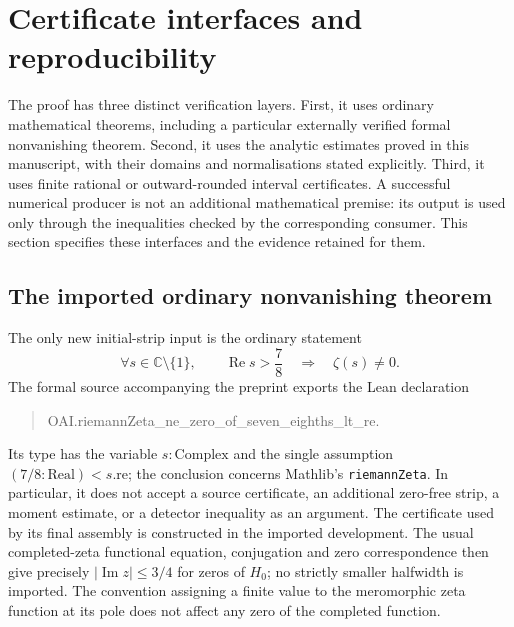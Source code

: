 \documentclass[11pt,a4paper]{article}
\theoremstyle{definition}
\theoremstyle{remark}
\newcommand{\Ree}{\operatorname{Re}}
\newcommand{\Imm}{\operatorname{Im}}
\begin{document}


\section{Certificate interfaces and reproducibility}\label{ver:section}

The proof has three distinct verification layers.  First, it uses ordinary
mathematical theorems, including a particular externally verified formal
nonvanishing theorem.  Second, it uses the analytic estimates proved in this
manuscript, with their domains and normalisations stated explicitly.  Third,
it uses finite rational or outward-rounded interval certificates.  A successful
numerical producer is not an additional mathematical premise: its output is
used only through the inequalities checked by the corresponding consumer.
This section specifies these interfaces and the evidence retained for them.

\subsection{The imported ordinary nonvanishing theorem}\label{ver:formal}

The only new initial-strip input is the ordinary statement
\begin{equation}\label{ver:zeta-input}
 \forall s\in\mathbb C\setminus\{1\},\qquad
 \Ree s>\frac78\quad\Longrightarrow\quad\zeta(s)\ne0.
\end{equation}
The formal source \cite{SevenEighths} accompanying the preprint
\cite{OAI:The-Quasi-Riemann-Hypothesis-September-30-2026} exports the Lean declaration
\begin{quote}\small\ttfamily
OAI.riemannZeta\_ne\_zero\_of\_seven\_eighths\_lt\_re.
\end{quote}
Its type has the variable $s:\mathrm{Complex}$ and the single assumption
$(7/8:\mathrm{Real})<s.\mathrm{re}$; the conclusion concerns Mathlib's
\texttt{riemannZeta}.  In particular, it does not accept a source certificate,
an additional zero-free strip, a moment estimate, or a detector inequality as
an argument.  The certificate used by its final assembly is constructed in
the imported development.  The usual completed-zeta functional equation,
conjugation and zero correspondence then give precisely
$|\Imm z|\le3/4$ for zeros of $H_0$; no strictly smaller halfwidth is imported.
The convention assigning a finite value to the meromorphic zeta function at
its pole does not affect any zero of the completed function.
\end{document}
